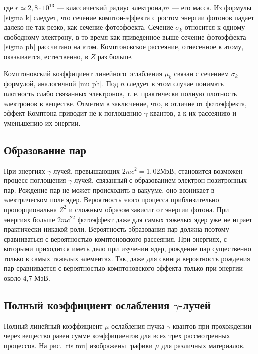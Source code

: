 \documentclass[a4paper,12pt]{article} %
\newcommand{\ga}{\ensuremath{\gamma}}
\begin{document}
	где $ r \simeq 2,8 \cdot 10^{13} $ --- классический радиус электрона,$ m $ --- его масса. Из формулы \eqref{sigma k} следует, что сечение комптон-эффекта с ростом энергии фотонов падает далеко не так резко, как сечение фотоэффекта.
	Сечение $ \sigma_k $ относится к одному свободному электрону, в то время как приведенное выше сечение фотоэффекта \eqref{sigma ph} рассчитано на атом.
	Комптоновское рассеяние, отнесенное к атому, оказывается, естественно, в $ Z $ раз больше. 
	
	Комптоновский коэффициент линейного ослабления $ \mu_k $ связан с
	сечением $ \sigma_k $ формулой, аналогичной \eqref{mu ph}. Под $ n $ следует в этом случае понимать плотность слабо связанных электронов, т. е. практически полную плотность электронов в веществе.
	Отметим в заключение, что, в отличие от фотоэффекта, эффект
	Комптона приводит не к поглощению \ga-квантов, а к их рассеянию и
	уменьшению их энергии.
	
	\subsection{Образование пар}
	
	При энергиях \ga-лучей, превышающих $ 2mc^2 = 1,02  $МэВ, становится возможен процесс поглощения \ga-лучей, связанный с образованием электрон-позитронных пар. Рождение пар не
	может происходить в вакууме, оно возникает в электрическом поле
	ядер. Вероятность этого процесса приблизительно пропорциональна
	$ Z^2  $ и сложным образом зависит от энергии фотона. При энергиях больше $ 2mc^22  $ фотоэффект даже для самых тяжелых ядер уже не играет
	практически никакой роли. Вероятность образования пар должна поэтому сравниваться с вероятностью комптоновского рассеяния. При
	энергиях, с которыми приходится иметь дело при изучении ядер, рождение пар существенно только в самых тяжелых элементах. Так, даже
	для свинца вероятность рождения пар сравнивается с вероятностью
	комптоновского эффекта только при энергии около 4,7 МэВ.
	
	\subsection{Полный коэффициент ослабления \ga-лучей}
	
	Полный линейный коэффициент $ \mu $ ослабления пучка \ga-квантов при прохождении через вещество равен сумме коэффициентов для всех трех рассмотренных процессов. На рис. \ref{ris mu} изображены графики $ \mu $ для различных материалов.
	
\end{document}

